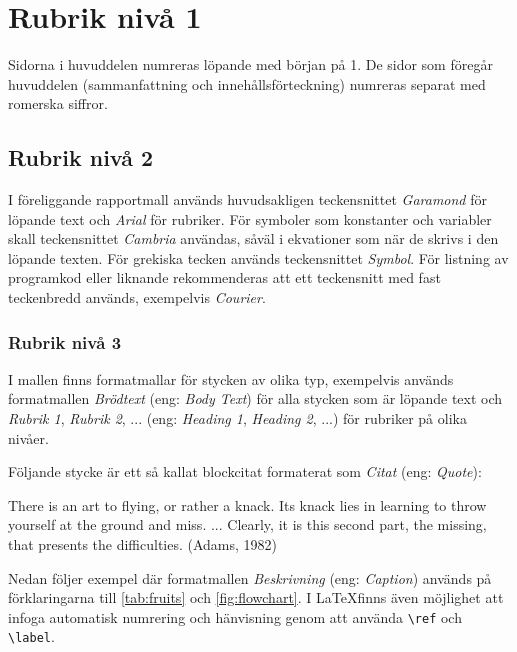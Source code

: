 \documentclass[12pt]{report}
\begin{document}
\setcounter{secnumdepth}{3}
\tableofcontents
\thispagestyle{fancy}



\newpage
{}

\chapter{Rubrik nivå 1}
Sidorna i huvuddelen numreras löpande med början på 1. De sidor som föregår
huvuddelen (sammanfattning och innehållsförteckning) numreras separat med
romerska siffror. 

\section{Rubrik nivå 2}
I föreliggande rapportmall används huvudsakligen teckensnittet
\textit{Garamond} för löpande text och \textit{Arial} för rubriker. För
symboler som konstanter och variabler skall teckensnittet \textit{Cambria}
användas, såväl i ekvationer som när de skrivs i den löpande texten. För
grekiska tecken används teckensnittet \textit{Symbol}. För listning av
programkod eller liknande rekommenderas att ett teckensnitt med fast
teckenbredd används, exempelvis \textit{Courier}.

\subsection{Rubrik nivå 3}
I mallen finns formatmallar för stycken av olika typ, exempelvis används
formatmallen \textit{Brödtext} (eng: \textit{Body Text}) för alla stycken
som är löpande text och \textit{Rubrik 1}, \textit{Rubrik 2}, ... (eng:
\textit{Heading 1}, \textit{Heading 2}, ...) för rubriker på olika nivåer.

Följande stycke är ett så kallat blockcitat formaterat som \textit{Citat}
(eng: \textit{Quote}):

\begin{displayquote}
    There is an art to flying, or rather a knack. Its knack lies in learning
    to throw yourself at the ground and miss. ... Clearly, it is this
    second part, the missing, that presents the difficulties. (Adams, 1982)
\end{displayquote}

Nedan följer exempel där formatmallen \textit{Beskrivning} (eng:
\textit{Caption}) används på förklaringarna till \ref{tab:fruits} och 
\ref{fig:flowchart}. I \LaTeX finns även möjlighet att infoga automatisk
numrering och hänvisning genom att använda \verb|\ref| och \verb|\label|.
\end{document}
